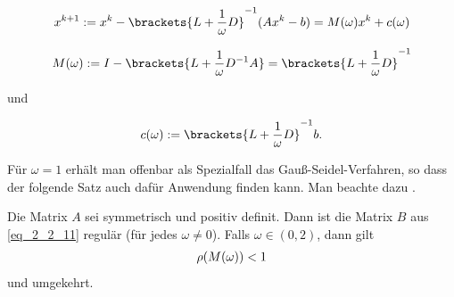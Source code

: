 \begin{align}
	x^{k+1} := x^k - \brackets{L+\frac{1}{\omega}D}^{-1}(Ax^k - b) = M(\omega)x^k + c(\omega)\notag
\end{align}

\begin{align}
	M(\omega) := I -  \brackets{L + \frac{1}{\omega} D^{-1} A} 
	= \brackets{L + \frac{1}{\omega} D}^{-1}
\end{align}

und

\begin{align}
	c(\omega) :=  \brackets{L+\frac{1}{\omega}D}^{-1}b.
\end{align}

Für $\omega = 1$ erhält man offenbar als Spezialfall das Gauß-Seidel-Verfahren, so dass der folgende Satz auch dafür Anwendung finden kann. Man beachte dazu .

\begin{proposition}
	Die Matrix $A$ sei symmetrisch und positiv definit. Dann ist die Matrix $B$ aus \eqref{eq_2_2_11} regulär (für jedes $\omega \neq 0$). Falls $\omega \in (0,2)$, dann gilt
	\begin{align}
		\rho(M(\omega)) < 1\notag
	\end{align}
	und umgekehrt.
\end{proposition}

